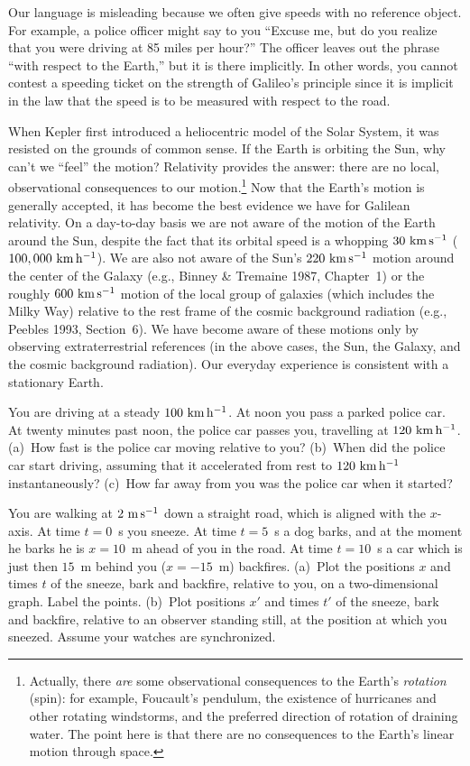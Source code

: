Our language is misleading because we often give speeds with no
reference object.  For example, a police officer might say to you
``Excuse me, but do you realize that you were driving at 85 miles per
hour?''  The officer leaves out the phrase ``with respect to the
Earth,'' but it is there implicitly.  In other words, you cannot
contest a speeding ticket on the strength of Galileo's principle since
it is implicit in the law that the speed is to be measured with
respect to the road.

When Kepler first introduced a heliocentric model of the Solar System,
it was resisted on the grounds of common sense.  If the Earth is
orbiting the Sun, why can't we ``feel'' the motion?  Relativity
provides the answer: there are no local, observational consequences to
our motion.\footnote{Actually, there {\em are\/} some observational
consequences to the Earth's {\em rotation\/} (spin): for example,
Foucault's pendulum, the existence of hurricanes and other rotating
windstorms, and the preferred direction of rotation of draining water.
The point here is that there are no consequences to the Earth's linear
motion through space.}  Now that the Earth's motion is generally
accepted, it has become the best evidence we have for Galilean
relativity.  On a day-to-day basis we are not aware of the motion of
the Earth around the Sun, despite the fact that its orbital speed is a
whopping $30~{\rm km\,s^{-1}}$ ($100,000~{\rm km\,h^{-1}}$).  We are also not aware of the
Sun's $220~{\rm km\,s^{-1}}$ motion around the center of the Galaxy (e.g., Binney
\& Tremaine 1987, Chapter~1) or the roughly $600~{\rm km\,s^{-1}}$ motion of the
local group of galaxies (which includes the Milky Way) relative to the
rest frame of the cosmic background radiation (e.g., Peebles 1993,
Section~6).  We have become aware of these motions only by observing
extraterrestrial references (in the above cases, the Sun, the Galaxy,
and the cosmic background radiation).  Our everyday experience is
consistent with a stationary Earth.

\begin{problem}
You are driving at a steady $100~{\rm km\,h^{-1}}$.  At noon you pass a parked
police car.  At twenty minutes past noon, the police car passes you,
travelling at $120~{\rm km\,h^{-1}}$.  (a)~How fast is the police car moving
relative to you?  (b)~When did the police car start driving, assuming
that it accelerated from rest to $120~{\rm km\,h^{-1}}$ instantaneously?  (c)~How
far away from you was the police car when it started?
\end{problem}

\begin{problem}
You are walking at $2~{\rm m\,s^{-1}}$ down a straight road, which is aligned with
the $x$-axis.  At time $t=0$~s you sneeze.  At time $t=5$~s a dog
barks, and at the moment he barks he is $x=10$~m ahead of you in the
road.  At time $t=10$~s a car which is just then $15$~m behind you
($x=-15$~m) backfires.  (a)~Plot the positions $x$ and times $t$ of
the sneeze, bark and backfire, relative to you, on a two-dimensional
graph.  Label the points.  (b)~Plot positions $x'$ and times $t'$ of
the sneeze, bark and backfire, relative to an observer standing still,
at the position at which you sneezed.  Assume your watches are
synchronized.
\end{problem}


